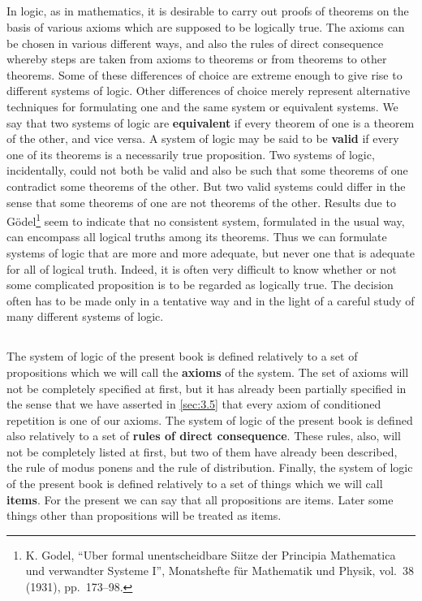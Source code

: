 \documentclass{book}
\begin{document}
\subsection{}
\label{sec:4.1}

In logic, as in mathematics, it is desirable to carry out proofs of theorems on the basis of various axioms which are supposed to be logically true.  The axioms can be chosen in various different ways, and also the rules of direct consequence whereby steps are taken from axioms to theorems or from theorems to other theorems.  Some of these differences of choice are extreme enough to give rise to different systems of logic.  Other differences of choice merely represent alternative techniques for formulating one and the same system or equivalent systems.  We say that two systems of logic are \textbf{equivalent} if every theorem of one is a theorem of the other, and vice versa.  A system of logic may be said to be \textbf{valid} if every one of its theorems is a necessarily true proposition.  Two systems of logic, incidentally, could not both be valid and also be such that some theorems of one contradict some theorems of the other.  But two valid systems could differ in the sense that some theorems of one are not theorems of the other.  Results due to Gödel\footnote{K. Godel, “Uber formal unentscheidbare Siitze der Principia Mathematica und verwandter Systeme I”, Monatshefte für Mathematik und Physik, vol.\ 38 (1931), pp.\ 173–98.} seem to indicate that no consistent system, formulated in the usual way, can encompass all logical truths among its theorems.  Thus we can formulate systems of logic that are more and more adequate, but never one that is adequate for all of logical truth.  Indeed, it is often very difficult to know whether or not some complicated proposition is to be regarded as logically true.  The decision often has to be made only in a tentative way and in the light of a careful study of many different systems of logic.

\subsection{}
\label{sec:4.2}

The system of logic of the present book is defined relatively to a set of propositions which we will call the \textbf{axioms} of the system.  The set of axioms will not be completely specified at first, but it has already been partially specified in the sense that we have asserted in \ref{sec:3.5} that every axiom of conditioned repetition is one of our axioms.  The system of logic of the present book is defined also relatively to a set of \textbf{rules of direct consequence}.  These rules, also, will not be completely listed at first, but two of them have already been described, the rule of modus ponens and the rule of distribution.  Finally, the system of logic of the present book is defined relatively to a set of things which we will call \textbf{items}.  For the present we can say that all propositions are items.  Later some things other than propositions will be treated as items.
\end{document}
